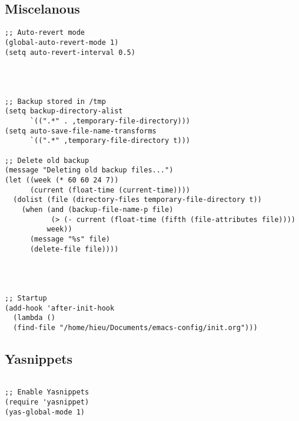 \documentclass[11pt]{article}
\begin{document}
\subsection{Miscelanous}
\label{sec:orge7fd6ce}
\begin{verbatim}
;; Auto-revert mode
(global-auto-revert-mode 1)
(setq auto-revert-interval 0.5)




;; Backup stored in /tmp
(setq backup-directory-alist
      `((".*" . ,temporary-file-directory)))
(setq auto-save-file-name-transforms
      `((".*" ,temporary-file-directory t)))

;; Delete old backup
(message "Deleting old backup files...")
(let ((week (* 60 60 24 7))
      (current (float-time (current-time))))
  (dolist (file (directory-files temporary-file-directory t))
    (when (and (backup-file-name-p file)
	       (> (- current (float-time (fifth (file-attributes file))))
		  week))
      (message "%s" file)
      (delete-file file))))




;; Startup
(add-hook 'after-init-hook 
  (lambda () 
  (find-file "/home/hieu/Documents/emacs-config/init.org")))

\end{verbatim}

\subsection{Yasnippets}
\label{sec:org32abe88}

\begin{verbatim}

;; Enable Yasnippets
(require 'yasnippet)
(yas-global-mode 1)

\end{verbatim}
\end{document}
